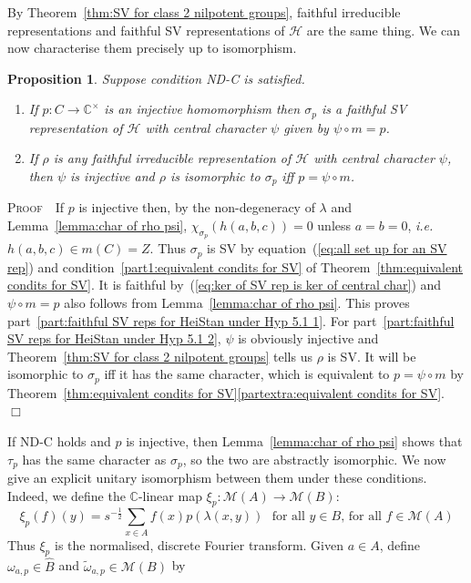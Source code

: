 \documentclass[12pt]{article}
\newtheorem{prop}{Proposition}[section]
\newcommand{\addwords}[1]{\ \ \ \mbox{#1}}
\newcommand{\bbC}{\ensuremath{\mathbb{C}}}\newcommand{\bbCp}{\ensuremath{\mathbb{C}_p}}
\newcommand{\bPf}{\noindent \textsc{Proof\ }}
\newcommand{\cH}{\ensuremath{\mathcal{H}}}
\newcommand{\cM}{\mathcal{M}}
\newcommand{\ePf}{~$\Box$\vertsp\par}%
\newcommand{\ie}{{\em i.e.}}
\renewcommand{\t}[1]{\tilde{#1}}
\newcommand{\vertsp}{\vspace{1ex}}
\begin{document}
By Theorem~\ref{thm:SV for class 2 nilpotent groups}, faithful irreducible representations and faithful SV representations of $\cH$ are the same thing. We can now characterise them precisely up to isomorphism.
\begin{prop}\label{prop:faithful SV reps for HeiStan under Hyp 5.1}
Suppose condition ND-C is satisfied.
\begin{enumerate} 
\item\label{part:faithful SV reps for HeiStan under Hyp 5.1 1} 
If $p:C\rightarrow \bbC^\times$ is an injective homomorphism then $\sigma_p$ is a faithful SV representation of $\cH$ with central character $\psi$ given by $\psi\circ m=p$. 
\item\label{part:faithful SV reps for HeiStan under Hyp 5.1 2} 
If $\rho$ is any faithful irreducible representation of $\cH$ with central character $\psi$, then $\psi$ is injective and $\rho$ is isomorphic to $\sigma_p$ iff $p=\psi\circ m$. 
\end{enumerate}
\end{prop}
\bPf\ If $p$ is injective then, by the non-degeneracy of $\lambda$ and Lemma~\ref{lemma:char of rho psi},  $\chi_{\sigma_p}(h(a,b,c))=0$ unless $a=b=0$, \ie\ $h(a,b,c)\in m(C)=Z$. Thus $\sigma_p$ is SV by equation~(\ref{eq:all set up for an SV rep}) and condition~\ref{part1:equivalent condits for SV} of Theorem~\ref{thm:equivalent condits for SV}. It is faithful by~(\ref{eq:ker of SV rep is ker of central char}) and $\psi\circ m=p$ also follows from Lemma~\ref{lemma:char of rho psi}. This proves part~\ref{part:faithful SV reps for HeiStan under Hyp 5.1 1}. For part~\ref{part:faithful SV reps for HeiStan under Hyp 5.1 2}, $\psi$ is obviously injective and Theorem~\ref{thm:SV for class 2 nilpotent groups} tells us $\rho$ is SV. It will be isomorphic to $\sigma_p$ iff it has the same character, which is equivalent to $p=\psi\circ m$ by Theorem~\ref{thm:equivalent condits for SV}\ref{partextra:equivalent condits for SV}.\ePf 
\noindent If ND-C holds and $p$ is injective, then Lemma~\ref{lemma:char of rho psi}  shows that $\tau_p$ has the same character as $\sigma_p$, so the two are abstractly isomorphic. We now give an explicit unitary isomorphism between them under these conditions. Indeed, we define the $\bbC$-linear map $\xi_p:\cM(A)\rightarrow\cM(B)$:  
$$
\xi_p(f)(y)=s^{-\frac12}\sum_{x\in A} f(x)p(\lambda(x,y))
\addwords{for all $y\in B$, for all $f\in \cM(A)$}
$$
Thus $\xi_p$ is the normalised, discrete Fourier transform. Given $a\in A$,  define $\omega_{a,p}\in \hat B$ and $\t \omega_{a,p}\in \cM(B)$ by
\end{document}
